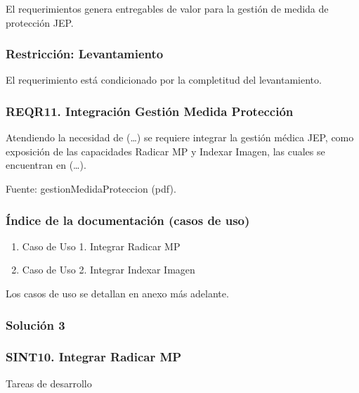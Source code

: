 \documentclass[
  paper=a4,
  ,captions=tableheading
]{scrartcl}
\providecommand{\tightlist}{%
  \setlength{\itemsep}{0pt}\setlength{\parskip}{0pt}}
\begin{document}
El requerimientos genera entregables de valor para la gestión de medida
de protección JEP.

\subsubsection{Restricción:
Levantamiento}\label{sec:restricciuxf3n-levantamiento}

El requerimiento está condicionado por la completitud del levantamiento.

\subsubsection{REQR11. Integración Gestión Medida
Protección}\label{sec:reqr11.-integraciuxf3n-gestiuxf3n-medida-protecciuxf3n}

Atendiendo la necesidad de (\ldots) se requiere integrar la gestión
médica JEP, como exposición de las capacidades Radicar MP y Indexar
Imagen, las cuales se encuentran en (\ldots).

Fuente: gestionMedidaProteccion (pdf).

\subsubsection{Índice de la documentación (casos de
uso)}\label{sec:uxedndice-de-la-documentaciuxf3n-casos-de-uso}

\begin{enumerate}
\def\labelenumi{\arabic{enumi}.}
\tightlist
\item
  Caso de Uso 1. Integrar Radicar MP
\item
  Caso de Uso 2. Integrar Indexar Imagen
\end{enumerate}

Los casos de uso se detallan en anexo más adelante.

\subsubsection{Solución 3}\label{sec:soluciuxf3n-3}

\subsubsection{SINT10. Integrar Radicar
MP}\label{sec:sint10.-integrar-radicar-mp}

Tareas de desarrollo
\end{document}
